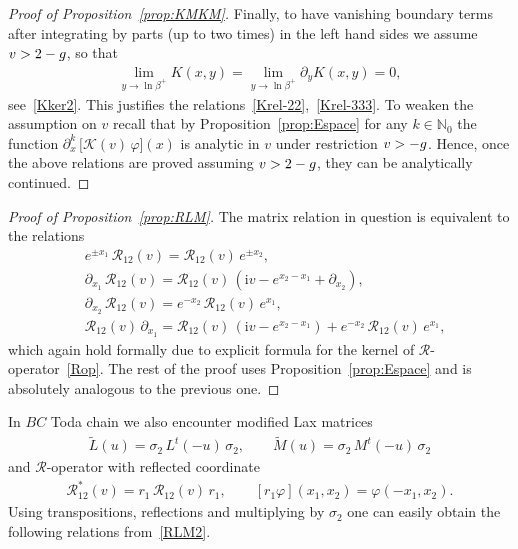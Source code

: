 \documentclass[11pt]{article}
\numberwithin{equation}{section}
\theoremstyle{plain}
\theoremstyle{definition}
\let\Im\relax
\DeclareMathOperator{\Im}{Im}
\renewcommand{\phi}{\varphi}
\renewcommand{\imath}{\mathrm{i}}
\begin{document}
\begin{proof}[Proof of Proposition~\ref{prop:KMKM}]
	Finally, to have vanishing boundary terms after integrating by parts (up to two times) in the left hand sides we assume $\Im v > 2 - g$, so that 
	\begin{align}
		\lim_{y \to \ln \beta^+} K(x,y) = \lim_{y \to \ln\beta^+} \partial_y K(x,y) = 0,
	\end{align}
	see~\eqref{Kker2}. This justifies the relations~\eqref{Krel-22},~\eqref{Krel-333}. To weaken the assumption on $v$ recall that by Proposition~\ref{prop:Espace} for any $k \in \mathbb{N}_0$ the function $\partial_x^k \, \bigl[ \mathcal{K}(v) \, \phi \bigr](x)$ is analytic in $v$ under restriction $\Im v > - g$. Hence, once the above relations are proved assuming $\Im v > 2 - g$, they can be analytically continued.
\end{proof}

\begin{proof}[Proof of Proposition~\ref{prop:RLM}]
	The matrix relation in question is equivalent to the relations
	\begin{align} 
		& e^{\pm x_1}\, \mathcal{R}_{12}(v) = \mathcal{R}_{12}(v) \, e^{\pm x_2}, \\[6pt] \label{d1R}
		& \partial_{x_1} \, \mathcal{R}_{12}(v) = \mathcal{R}_{12}(v) \, (\imath v - e^{x_2 - x_1} + \partial_{x_2}), \\[6pt] \label{d2R}
		& \partial_{x_2} \, \mathcal{R}_{12}(v) = e^{-x_2} \, \mathcal{R}_{12}(v) \, e^{x_1}, \\[6pt] \label{Rd1}
		& \mathcal{R}_{12}(v) \, \partial_{x_1} = \mathcal{R}_{12}(v) \, ( \imath v - e^{x_2 - x_1}) +  e^{-x_2} \, \mathcal{R}_{12}(v) \, e^{x_1},
	\end{align}
	which again hold formally due to explicit formula for the kernel of $\mathcal{R}$-operator~\eqref{Rop}. The rest of the proof uses Proposition~\ref{prop:Espace} and is absolutely analogous to the previous one. 
\end{proof}

In $BC$ Toda chain we also encounter modified Lax matrices
\begin{align}
	\widetilde{L}(u) = \sigma_2 \, L^t(-u) \, \sigma_2, \qquad 	\widetilde{M}(u) = \sigma_2 \, M^t(-u) \, \sigma_2
\end{align}
and $\mathcal{R}$-operator with reflected coordinate
\begin{align}
	\mathcal{R}^*_{12}(v) = r_1 \, \mathcal{R}_{12}(v) \, r_1, \qquad [ r_1 \phi ](x_1, x_2) = \phi(-x_1, x_2).
\end{align}
Using transpositions, reflections and multiplying by $\sigma_2$ one can easily obtain the following relations from~\eqref{RLM2}.
\end{document}
